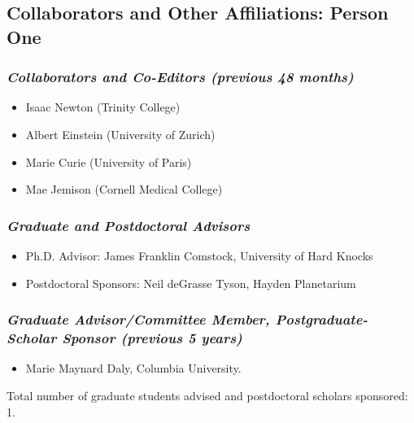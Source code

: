 \subsection*{Collaborators and Other Affiliations: Person One}

\subsubsection*{\textit{Collaborators and Co-Editors (previous 48 months)}}
\begin{itemize}
\item Isaac Newton (Trinity College)
\item Albert Einstein (University of Zurich)
\item Marie Curie (University of Paris)
\item Mae Jemison (Cornell Medical College)
\end{itemize}

\subsubsection*{\textit{Graduate and Postdoctoral Advisors}}
\begin{itemize}
\item Ph.D. Advisor: James Franklin Comstock, University of Hard Knocks
\item Postdoctoral Sponsors: Neil deGrasse Tyson, Hayden Planetarium
\end{itemize}
\subsubsection*{\textit{Graduate Advisor/Committee Member, Postgraduate-Scholar Sponsor (previous 5 years)}}
\begin{itemize}
\item Marie Maynard Daly, Columbia University.
\end{itemize}
Total number of graduate students advised and postdoctoral scholars sponsored: 1.